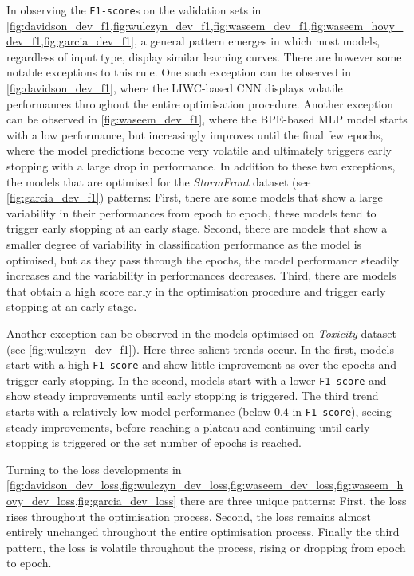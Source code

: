 In observing the \texttt{F1-score}s on the validation sets in \cref{fig:davidson_dev_f1,fig:wulczyn_dev_f1,fig:waseem_dev_f1,fig:waseem_hovy_dev_f1,fig:garcia_dev_f1}, a general pattern emerges in which most models, regardless of input type, display similar learning curves.
There are however some notable exceptions to this rule.
One such exception can be observed in \cref{fig:davidson_dev_f1}, where the LIWC-based CNN displays volatile performances throughout the entire optimisation procedure.
Another exception can be observed in \cref{fig:waseem_dev_f1}, where the BPE-based MLP model starts with a low performance, but increasingly improves until the final few epochs, where the model predictions become very volatile and ultimately triggers early stopping with a large drop in performance.
In addition to these two exceptions, the models that are optimised for the \textit{StormFront} dataset (see \cref{fig:garcia_dev_f1})  patterns:
First, there are some models that show a large variability in their performances from epoch to epoch, these models tend to trigger early stopping at an early stage.
Second, there are models that show a smaller degree of variability in classification performance as the model is optimised, but as they pass through the epochs, the model performance steadily increases and the variability in performances decreases.
Third, there are models that obtain a high score early in the optimisation procedure and trigger early stopping at an early stage.

Another exception can be observed in the models optimised on \textit{Toxicity} dataset (see \cref{fig:wulczyn_dev_f1}).
Here three salient trends occur.
In the first, models start with a high \texttt{F1-score} and show little improvement as over the epochs and trigger early stopping.
In the second, models start with a lower \texttt{F1-score} and show steady improvements until early stopping is triggered.
The third trend starts with a relatively low model performance (below $0.4$ in \texttt{F1-score}), seeing steady improvements, before reaching a plateau and continuing until early stopping is triggered or the set number of epochs is reached.

Turning to the loss developments in \cref{fig:davidson_dev_loss,fig:wulczyn_dev_loss,fig:waseem_dev_loss,fig:waseem_hovy_dev_loss,fig:garcia_dev_loss} there are three unique patterns: 
First, the loss rises throughout the optimisation process.
Second, the loss remains almost entirely unchanged throughout the entire optimisation process. 
Finally the third pattern, the loss is volatile throughout the process, rising or dropping from epoch to epoch.


